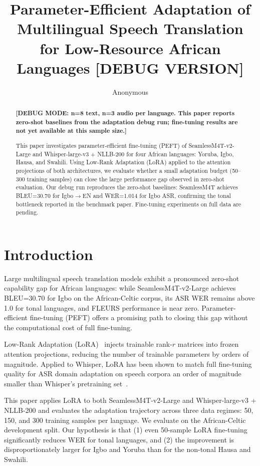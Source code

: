 \documentclass[11pt,a4paper]{article}
\title{Parameter-Efficient Adaptation of Multilingual Speech Translation\\
for Low-Resource African Languages [DEBUG VERSION]}
\author{Anonymous}
\date{}
\newcommand{\modelSM}{SeamlessM4T-v2-Large}
\newcommand{\modelWN}{Whisper-large-v3 + NLLB-200}
\newcommand{\dataAC}{African-Celtic}
\begin{document}
\maketitle

\begin{abstract}
\textbf{[DEBUG MODE: n=8 text, n=3 audio per language. This paper reports zero-shot baselines from the adaptation debug run; fine-tuning results are not yet available at this sample size.]}

This paper investigates parameter-efficient fine-tuning (PEFT) of \modelSM{} and \modelWN{} for four African languages: Yoruba, Igbo, Hausa, and Swahili. Using Low-Rank Adaptation (LoRA) applied to the attention projections of both architectures, we evaluate whether a small adaptation budget (50–300 training samples) can close the large performance gap observed in zero-shot evaluation. Our debug run reproduces the zero-shot baselines: SeamlessM4T achieves BLEU=30.70 for Igbo$\to$EN and WER=1.014 for Igbo ASR, confirming the tonal bottleneck reported in the benchmark paper. Fine-tuning experiments on full data are pending.
\end{abstract}

\section{Introduction}
\label{sec:intro}

Large multilingual speech translation models exhibit a pronounced zero-shot capability gap for African languages: while SeamlessM4T-v2-Large achieves BLEU=30.70 for Igbo on the African-Celtic corpus, its ASR WER remains above 1.0 for tonal languages, and FLEURS performance is near zero. Parameter-efficient fine-tuning (PEFT) offers a promising path to closing this gap without the computational cost of full fine-tuning.

Low-Rank Adaptation (LoRA)~\citep{hu2022lora} injects trainable rank-$r$ matrices into frozen attention projections, reducing the number of trainable parameters by orders of magnitude. Applied to Whisper, LoRA has been shown to match full fine-tuning quality for ASR domain adaptation on speech corpora an order of magnitude smaller than Whisper's pretraining set~\citep{majumdar2023lora}.

This paper applies LoRA to both \modelSM{} and \modelWN{} and evaluates the adaptation trajectory across three data regimes: 50, 150, and 300 training samples per language. We evaluate on the \dataAC{} development split. Our hypothesis is that (1) even 50-sample LoRA fine-tuning significantly reduces WER for tonal languages, and (2) the improvement is disproportionately larger for Igbo and Yoruba than for the non-tonal Hausa and Swahili.
\end{document}
